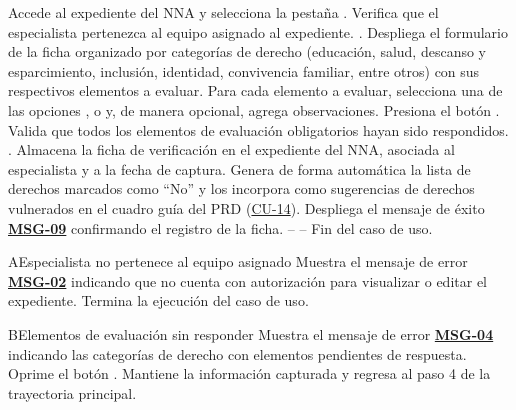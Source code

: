 \begin{UCtrayectoria}
	\UCpaso[\UCactor] Accede al expediente del NNA y selecciona la pestaña .
	\UCpaso Verifica que el especialista pertenezca al equipo asignado al expediente. .
	\UCpaso Despliega el formulario de la ficha organizado por categorías de derecho (educación, salud, descanso y esparcimiento, inclusión, identidad, convivencia familiar, entre otros) con sus respectivos elementos a evaluar.
	\UCpaso[\UCactor] Para cada elemento a evaluar, selecciona una de las opciones ,  o  y, de manera opcional, agrega observaciones.
	\UCpaso[\UCactor] Presiona el botón .
	\UCpaso Valida que todos los elementos de evaluación obligatorios hayan sido respondidos. .
	\UCpaso Almacena la ficha de verificación en el expediente del NNA, asociada al especialista y a la fecha de captura.
	\UCpaso Genera de forma automática la lista de derechos marcados como ``No'' y los incorpora como sugerencias de derechos vulnerados en el cuadro guía del PRD (\hyperlink{CU-14}{CU-14}).
	\UCpaso Despliega el mensaje de éxito \hyperlink{mMSG09}{\bf MSG-09} confirmando el registro de la ficha.
	\UCpaso[] -- -- Fin del caso de uso.
\end{UCtrayectoria}

\begin{UCtrayectoriaA}{A}{Especialista no pertenece al equipo asignado}
	\UCpaso Muestra el mensaje de error \hyperlink{mMSG02}{\bf MSG-02} indicando que no cuenta con autorización para visualizar o editar el expediente.
	\UCpaso Termina la ejecución del caso de uso.
\end{UCtrayectoriaA}

\begin{UCtrayectoriaA}{B}{Elementos de evaluación sin responder}
	\UCpaso Muestra el mensaje de error \hyperlink{mMSG04}{\bf MSG-04} indicando las categorías de derecho con elementos pendientes de respuesta.
	\UCpaso[\UCactor] Oprime el botón .
	\UCpaso Mantiene la información capturada y regresa al paso 4 de la trayectoria principal.
\end{UCtrayectoriaA}
